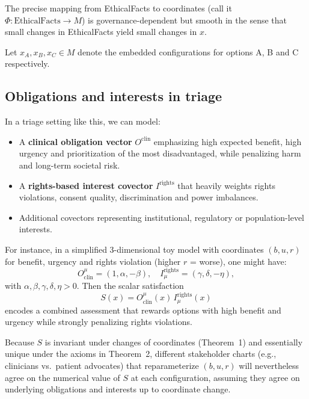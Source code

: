 \documentclass[12pt]{article}
\theoremstyle{remark}
\begin{document}
The precise mapping from EthicalFacts to coordinates (call it $\Phi\colon \text{EthicalFacts} \to M$) is governance-dependent but smooth in the sense that small changes in EthicalFacts yield small changes in $x$.

Let $x_A, x_B, x_C \in M$ denote the embedded configurations for options A, B and C respectively.

\subsection{Obligations and interests in triage}

In a triage setting like this, we can model:

\begin{itemize}
    \item A \textbf{clinical obligation vector} $O^{\mathrm{clin}}$ emphasizing high expected benefit, high urgency and prioritization of the most disadvantaged, while penalizing harm and long-term societal risk.

    \item A \textbf{rights-based interest covector} $I^{\mathrm{rights}}$ that heavily weights rights violations, consent quality, discrimination and power imbalances.

    \item Additional covectors representing institutional, regulatory or population-level interests.
\end{itemize}

For instance, in a simplified 3-dimensional toy model with coordinates $(b, u, r)$ for benefit, urgency and rights violation (higher $r$ = worse), one might have:
\begin{equation}
    O^{\mu}_{\mathrm{clin}} = (1, \alpha, -\beta),\quad
    I^{\mathrm{rights}}_{\mu} = (\gamma, \delta, -\eta),
\end{equation}
with $\alpha, \beta, \gamma, \delta, \eta > 0$. Then the scalar satisfaction
\begin{equation}
    S(x) = O^{\mu}_{\mathrm{clin}}(x)\, I^{\mathrm{rights}}_{\mu}(x)
\end{equation}
encodes a combined assessment that rewards options with high benefit and urgency while strongly penalizing rights violations.

Because $S$ is invariant under changes of coordinates (Theorem~1) and essentially unique under the axioms in Theorem~2, different stakeholder charts (e.g., clinicians vs.\ patient advocates) that reparameterize $(b, u, r)$ will nevertheless agree on the numerical value of $S$ at each configuration, assuming they agree on underlying obligations and interests up to coordinate change.
\end{document}
